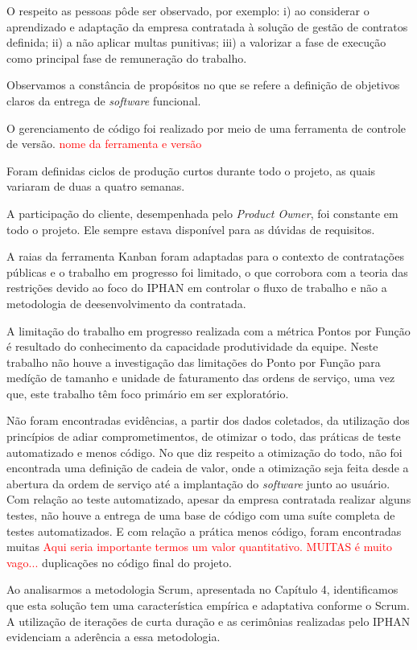 O respeito as pessoas pôde ser observado, por exemplo: i) ao considerar o aprendizado e adaptação da empresa contratada à solução de gestão de contratos definida; ii) a não aplicar multas punitivas; iii) a valorizar a fase de execução como principal fase de remuneração do trabalho. 

Observamos a constância de propósitos no que se refere a definição de objetivos claros da entrega de \textit{software} funcional.

O gerenciamento de código foi realizado por meio de uma ferramenta de controle de versão. \textcolor{red}{nome da ferramenta e versão}

Foram definidas ciclos de produção curtos durante todo o projeto, as quais variaram de duas a quatro semanas.

A participação do cliente, desempenhada pelo \textit{Product Owner}, foi constante em todo o projeto. Ele sempre estava disponível para as dúvidas de requisitos.

A raias da ferramenta Kanban foram adaptadas para o contexto de contratações públicas e o trabalho em progresso foi limitado, o que corrobora com a teoria das restrições devido ao foco do IPHAN em controlar o fluxo de trabalho e não a metodologia de deesenvolvimento da contratada.

A limitação do trabalho em progresso realizada com a métrica Pontos por Função é resultado do conhecimento da capacidade produtividade da equipe. Neste trabalho não houve a investigação das limitações do Ponto por Função para medíção de tamanho e unidade de faturamento das ordens de serviço, uma vez que, este trabalho têm foco primário em ser exploratório.  

Não foram encontradas evidências, a partir dos dados coletados, da utilização dos princípios de adiar comprometimentos, de otimizar o todo, das práticas de teste automatizado e menos código. No que diz respeito a otimização do todo, não foi encontrada uma definição de cadeia de valor, onde a otimização seja feita desde a abertura da ordem de serviço até a implantação do \textit{software} junto ao usuário. Com relação ao teste automatizado, apesar da empresa contratada realizar alguns testes, não houve a entrega de uma base de código com uma suíte completa de testes automatizados. E com relação a prática menos código, foram encontradas muitas \textcolor{red}{Aqui seria importante termos um valor quantitativo. MUITAS é muito vago...} duplicações no código final do projeto.

Ao analisarmos a metodologia Scrum, apresentada no Capítulo 4, identificamos que esta solução tem uma característica empírica e adaptativa conforme o Scrum. A utilização de iterações de curta duração e as cerimônias realizadas pelo IPHAN evidenciam a aderência a essa metodologia.

